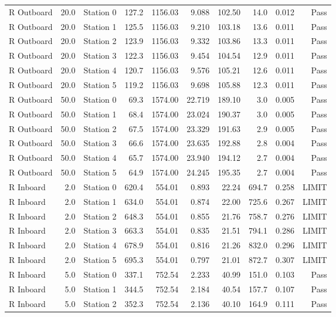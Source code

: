 \begin{tabular}{lrrrrrrrrr}
R Outboard & 20.0 & Station 0 & 127.2 & 1156.03 & 9.088 & 102.50 & 14.0 & 0.012 & Pass \\
R Outboard & 20.0 & Station 1 & 125.5 & 1156.03 & 9.210 & 103.18 & 13.6 & 0.011 & Pass \\
R Outboard & 20.0 & Station 2 & 123.9 & 1156.03 & 9.332 & 103.86 & 13.3 & 0.011 & Pass \\
R Outboard & 20.0 & Station 3 & 122.3 & 1156.03 & 9.454 & 104.54 & 12.9 & 0.011 & Pass \\
R Outboard & 20.0 & Station 4 & 120.7 & 1156.03 & 9.576 & 105.21 & 12.6 & 0.011 & Pass \\
R Outboard & 20.0 & Station 5 & 119.2 & 1156.03 & 9.698 & 105.88 & 12.3 & 0.011 & Pass \\
R Outboard & 50.0 & Station 0 & 69.3 & 1574.00 & 22.719 & 189.10 & 3.0 & 0.005 & Pass \\
R Outboard & 50.0 & Station 1 & 68.4 & 1574.00 & 23.024 & 190.37 & 3.0 & 0.005 & Pass \\
R Outboard & 50.0 & Station 2 & 67.5 & 1574.00 & 23.329 & 191.63 & 2.9 & 0.005 & Pass \\
R Outboard & 50.0 & Station 3 & 66.6 & 1574.00 & 23.635 & 192.88 & 2.8 & 0.004 & Pass \\
R Outboard & 50.0 & Station 4 & 65.7 & 1574.00 & 23.940 & 194.12 & 2.7 & 0.004 & Pass \\
R Outboard & 50.0 & Station 5 & 64.9 & 1574.00 & 24.245 & 195.35 & 2.7 & 0.004 & Pass \\
R Inboard & 2.0 & Station 0 & 620.4 & 554.01 & 0.893 & 22.24 & 694.7 & 0.258 & LIMIT \\
R Inboard & 2.0 & Station 1 & 634.0 & 554.01 & 0.874 & 22.00 & 725.6 & 0.267 & LIMIT \\
R Inboard & 2.0 & Station 2 & 648.3 & 554.01 & 0.855 & 21.76 & 758.7 & 0.276 & LIMIT \\
R Inboard & 2.0 & Station 3 & 663.3 & 554.01 & 0.835 & 21.51 & 794.1 & 0.286 & LIMIT \\
R Inboard & 2.0 & Station 4 & 678.9 & 554.01 & 0.816 & 21.26 & 832.0 & 0.296 & LIMIT \\
R Inboard & 2.0 & Station 5 & 695.3 & 554.01 & 0.797 & 21.01 & 872.7 & 0.307 & LIMIT \\
R Inboard & 5.0 & Station 0 & 337.1 & 752.54 & 2.233 & 40.99 & 151.0 & 0.103 & Pass \\
R Inboard & 5.0 & Station 1 & 344.5 & 752.54 & 2.184 & 40.54 & 157.7 & 0.107 & Pass \\
R Inboard & 5.0 & Station 2 & 352.3 & 752.54 & 2.136 & 40.10 & 164.9 & 0.111 & Pass \\

\end{tabular}
